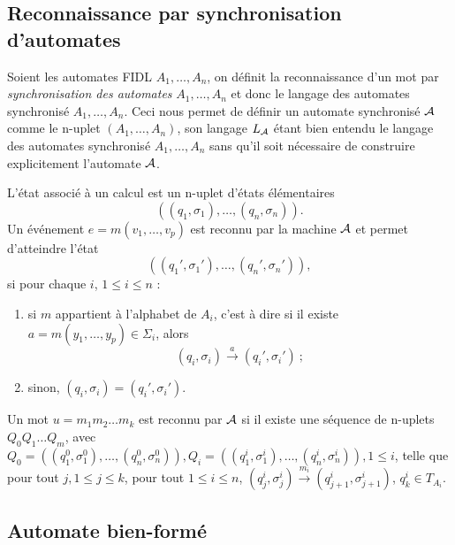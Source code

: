 \subsection{Reconnaissance par synchronisation d'automates}
\label{sec:reconn-par-synchr}

Soient les automates \textsf{FIDL}
$A_1,\dots,A_n$, on d\'efinit la
reconnaissance d'un mot par \emph{synchronisation des automates}
$A_1,\dots,A_n$ et donc le langage des automates synchronis\'e
$A_1,\dots, A_n$. Ceci nous permet de d\'efinir un automate
synchronis\'e $\cal A$ comme le n-uplet $(A_1,\dots,A_n)$, son
langage $L_{\cal A}$ \'etant bien entendu le langage des automates
synchronis\'e $A_1,\dots,A_n$ sans qu'il soit n\'ecessaire de
construire explicitement l'automate $\cal A$. 

L'\'etat associ\'e \`a un calcul est  un n-uplet d'\'etats \'el\'ementaires
$$((q_1,\sigma_1),\dots,(q_n,\sigma_n)).$$
Un \'ev\'enement $e=m(v_1,\dots,v_p)$ est reconnu par la machine ${\cal A}$ et permet
d'atteindre l'\'etat
$$((q_1',\sigma_1'),\dots,(q_n',\sigma_n')),$$
si pour chaque $i$, $1\leq i\leq n$ :
\begin{enumerate}
  \item si $m$ appartient \`a l'alphabet de $A_i$, c'est \`a dire
  si il existe $a=m(y_1,\dots,y_p)\in \Sigma_i$,  alors
    $$(q_i,\sigma_i) \xrightarrow{a} (q_i',\sigma_i')\ ;$$
  \item sinon, $(q_i,\sigma_i) = (q_i',\sigma_i').$
\end{enumerate}
Un mot $u=m_1 m_2 \dots m_k$ est reconnu par $\cal A$ si il existe une
s\'equence de n-uplets  $Q_0 Q_1 \dots Q_m$, avec $Q_0 =
((q_1^0,\sigma_1^0),\dots,(q_n^0,\sigma_n^0)), Q_i =
((q_1^i,\sigma_1^i),\dots,(q_n^i,\sigma_n^i)), 1\leq i$, telle que pour tout
$j, 1\leq j\leq k$, pour tout $1\leq i\leq n$,  $(q_{j}^i,\sigma_j^i)
\xrightarrow{m_i} (q_{j+1}^i,\sigma_{j+1}^i)$, $q_k^i\in T_{A_i}$.


\subsection{Automate bien-form\'e}

